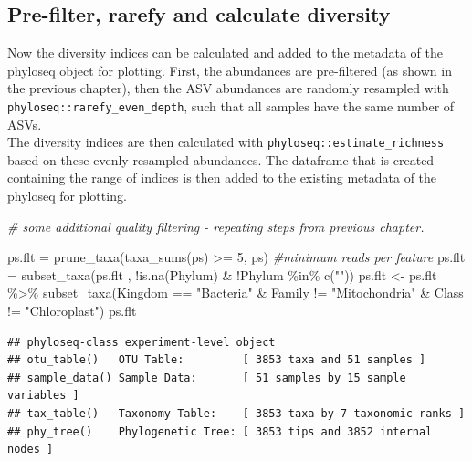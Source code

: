 \documentclass[
]{book}
\newenvironment{Shaded}{\begin{snugshade}}{\end{snugshade}}
\newcommand{\CommentTok}[1]{\textcolor[rgb]{0.56,0.35,0.01}{\textit{#1}}}
\newcommand{\DecValTok}[1]{\textcolor[rgb]{0.00,0.00,0.81}{#1}}
\newcommand{\FunctionTok}[1]{\textcolor[rgb]{0.00,0.00,0.00}{#1}}
\newcommand{\NormalTok}[1]{#1}
\newcommand{\OtherTok}[1]{\textcolor[rgb]{0.56,0.35,0.01}{#1}}
\newcommand{\SpecialCharTok}[1]{\textcolor[rgb]{0.00,0.00,0.00}{#1}}
\newcommand{\StringTok}[1]{\textcolor[rgb]{0.31,0.60,0.02}{#1}}
\begin{document}
\hypertarget{pre-filter-rarefy-and-calculate-diversity}{%
\subsection{Pre-filter, rarefy and calculate diversity}\label{pre-filter-rarefy-and-calculate-diversity}}

Now the diversity indices can be calculated and added to the metadata of the phyloseq object for plotting. First, the abundances are pre-filtered (as shown in the previous chapter), then the ASV abundances are randomly resampled with \texttt{phyloseq::rarefy\_even\_depth}, such that all samples have the same number of ASVs.\\
The diversity indices are then calculated with \texttt{phyloseq::estimate\_richness} based on these evenly resampled abundances. The dataframe that is created containing the range of indices is then added to the existing metadata of the phyloseq for plotting.

\begin{Shaded}
\begin{Highlighting}[]
\CommentTok{\# some additional quality filtering {-} repeating steps from previous chapter. }
  
\NormalTok{ps.flt }\OtherTok{=} \FunctionTok{prune\_taxa}\NormalTok{(}\FunctionTok{taxa\_sums}\NormalTok{(ps) }\SpecialCharTok{\textgreater{}=} \DecValTok{5}\NormalTok{, ps) }\CommentTok{\#minimum reads per feature }
\NormalTok{ps.flt  }\OtherTok{=} \FunctionTok{subset\_taxa}\NormalTok{(ps.flt , }\SpecialCharTok{!}\FunctionTok{is.na}\NormalTok{(Phylum) }\SpecialCharTok{\&} \SpecialCharTok{!}\NormalTok{Phylum }\SpecialCharTok{\%in\%} \FunctionTok{c}\NormalTok{(}\StringTok{""}\NormalTok{))}
\NormalTok{ps.flt }\OtherTok{\textless{}{-}}\NormalTok{ ps.flt }\SpecialCharTok{\%\textgreater{}\%}
  \FunctionTok{subset\_taxa}\NormalTok{(Kingdom }\SpecialCharTok{==} \StringTok{"Bacteria"} \SpecialCharTok{\&}\NormalTok{ Family  }\SpecialCharTok{!=} \StringTok{"Mitochondria"} \SpecialCharTok{\&}\NormalTok{ Class   }\SpecialCharTok{!=} \StringTok{"Chloroplast"}\NormalTok{)}
\NormalTok{ps.flt }
\end{Highlighting}
\end{Shaded}

\begin{verbatim}
## phyloseq-class experiment-level object
## otu_table()   OTU Table:         [ 3853 taxa and 51 samples ]
## sample_data() Sample Data:       [ 51 samples by 15 sample variables ]
## tax_table()   Taxonomy Table:    [ 3853 taxa by 7 taxonomic ranks ]
## phy_tree()    Phylogenetic Tree: [ 3853 tips and 3852 internal nodes ]
\end{verbatim}
\end{document}

